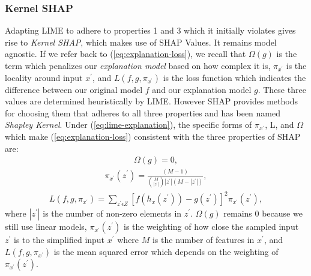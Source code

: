 \subsubsection{Kernel SHAP}
Adapting LIME to adhere to properties 1 and 3 which it initially violates gives rise to \emph{Kernel SHAP}, which makes use of SHAP Values. It remains model agnostic. If we refer back to (\ref{eq:explanation-loss}), we recall that $\Omega(g)$ is the term which penalizes our \emph{explanation model} based on how complex it is, $\pi_{x^{'}}$ is the locality around input $x^{'}$, and $L(f, g, \pi_{x^{'}})$ is the loss function which indicates the difference between our original model $f$ and our explanation model $g$. These three values are determined heuristically by LIME. However SHAP \cite{NIPS2017_7062} provides methods for choosing them that adheres to all three properties and has been named \emph{Shapley Kernel}.
Under (\ref{eq:lime-explanation}), the specific forms of $\pi_{x^{'}}$, L, and $\Omega$ which make (\ref{eq:explanation-loss}) consistent with the three properties of SHAP are:
\begin{align*}
   \Omega(g) = 0,
\end{align*}
\begin{align*}
    \pi_{x^{'}}(z^{'}) = \frac{(M-1)}{{M \choose |z^{'}|}|z^{'}|(M-|z^{'}|)},
\end{align*}
\begin{align*}
    L(f,g,\pi_{x^{'}}) = \sum\limits_{z^{'}\epsilon Z} [f(h_{x}(z^{'})) - g(z^{'})]^{2} \pi_{x^{'}}(z^{'}),
\end{align*}
where $|z^{'}|$ is the number of non-zero elements in $z^{'}$. $\Omega(g)$ remains 0 because we still use linear models, $\pi_{x^{'}}(z^{'})$ is the weighting of how close the sampled input $z^{'}$ is to the simplified input $x^{'}$  where $M$ is the number of features in $x^{'}$, and $L(f,g,\pi_{x^{'}})$ is the mean squared error which depends on the weighting of $\pi_{x^{'}}(z^{'})$. 


